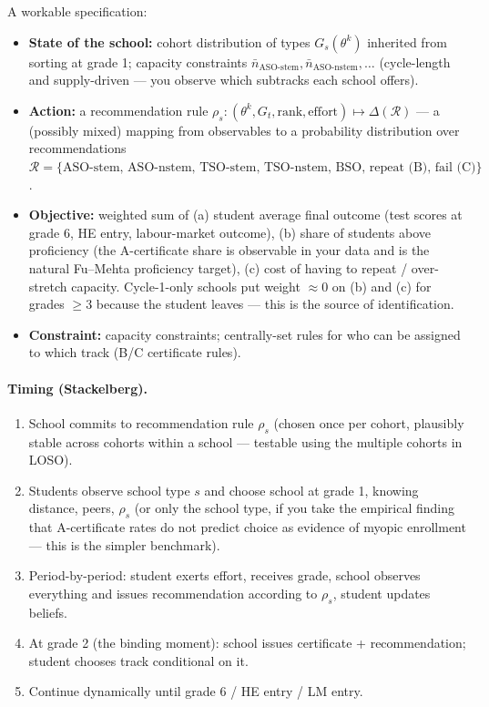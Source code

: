 \documentclass{article}
\begin{document}
A workable specification:
\begin{itemize}[leftmargin=*]
  \item \textbf{State of the school:} cohort distribution of types
  $G_s(\theta^k)$ inherited from sorting at grade 1; capacity constraints
  $\bar{n}_{\text{ASO-stem}}, \bar{n}_{\text{ASO-nstem}}, \dots$
  (cycle-length and supply-driven --- you observe which subtracks each school
  offers).
  \item \textbf{Action:} a recommendation rule
  $\rho_s : (\theta^k, G_t, \text{rank}, \text{effort}) \mapsto \Delta(\mathcal{R})$
  --- a (possibly mixed) mapping from observables to a probability
  distribution over recommendations $\mathcal{R} = \{\text{ASO-stem,
  ASO-nstem, TSO-stem, TSO-nstem, BSO, repeat (B), fail (C)}\}$.
  \item \textbf{Objective:} weighted sum of (a) student average final
  outcome (test scores at grade 6, HE entry, labour-market outcome),
  (b) share of students above proficiency (the A-certificate share is
  observable in your data and is the natural Fu--Mehta proficiency target),
  (c) cost of having to repeat / over-stretch capacity. Cycle-1-only schools
  put weight $\approx 0$ on (b) and (c) for grades $\geq 3$ because the
  student leaves --- this is the source of identification.
  \item \textbf{Constraint:} capacity constraints; centrally-set rules for
  who can be assigned to which track (B/C certificate rules).
\end{itemize}

\paragraph{Timing (Stackelberg).}
\begin{enumerate}[leftmargin=*,label=Stage \arabic*.]
  \item School commits to recommendation rule $\rho_s$ (chosen once per
  cohort, plausibly stable across cohorts within a school --- testable using
  the multiple cohorts in LOSO).
  \item Students observe school type $s$ and choose school at grade 1,
  knowing distance, peers, $\rho_s$ (or only the school type, if you take
  the empirical finding that A-certificate rates do not predict choice as
  evidence of myopic enrollment --- this is the simpler benchmark).
  \item Period-by-period: student exerts effort, receives grade, school
  observes everything and issues recommendation according to $\rho_s$,
  student updates beliefs.
  \item At grade 2 (the binding moment): school issues certificate +
  recommendation; student chooses track conditional on it.
  \item Continue dynamically until grade 6 / HE entry / LM entry.
\end{enumerate}
\end{document}
